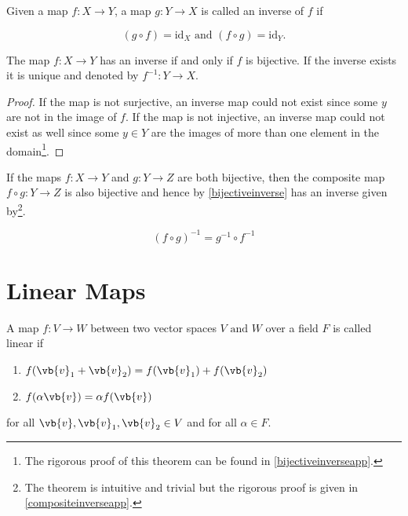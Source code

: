 \documentclass[a4paper,12pt]{report}
\begin{document}
\begin{definition}
Given a map \(f: X \rightarrow Y\), a map \(g: Y \rightarrow X\) is called an inverse of \(f\) if

\begin{equation}
    (g \circ  f) = \mathrm{id}_{X} \text { and } (f \circ g) = \mathrm{id}_{Y}. 
\end{equation}

\end{definition}

\begin{theorem} \label{bijectiveinverse} 
The map \(f: X \rightarrow Y\) has an inverse if and only if \(f\) is bijective. If the inverse exists it is unique and denoted by \(f^{-1} : Y \rightarrow X\). 
\end{theorem}

\begin{proof}
    If the map is not surjective, an inverse map could not exist since some \(y\) are not in the image of \(f\). If the map is not injective, an inverse map could not exist as well since some \(y \in  Y\) are the images of more than one element in the domain\footnote{The rigorous proof of this theorem can be found in \cref{bijectiveinverseapp}.}.
\end{proof}

\begin{theorem}  \label{compositeinversetheo} 
If the maps \(f: X \rightarrow Y\) and \(g: Y \rightarrow Z\) are both bijective, then the composite map \(f \circ g: Y \rightarrow Z\) is also bijective and hence by \cref{bijectiveinverse} has an inverse given by\footnote{The theorem is intuitive and trivial but the rigorous proof is given in \cref{compositeinverseapp}.}.

\begin{equation} \label{compositeinverseeq} 
    (f \circ g)^{-1} = g^{-1} \circ f^{-1} 
\end{equation}

\end{theorem}


\section{Linear Maps}

\begin{definition} \label{linearmap} 
A map \(f:V \rightarrow W\) between two vector spaces \(V \text { and }  W\) over a field \(F\) is called linear if 

\begin{enumerate}[label=(E\arabic*)]
    \item \(f(\vb{v} _{1} + \vb{v} _{2}  ) = f(\vb{v} _{1} ) + f(\vb{v} _{2} )\)
    \item \(f(\alpha \vb{v} ) = \alpha f(\vb{v} )\)  
\end{enumerate}

for all \(\vb{v} ,\vb{v} _{1}, \vb{v} _{2}\in V  \) and for all \(\alpha \in  F\). 

\end{definition}
\end{document}
